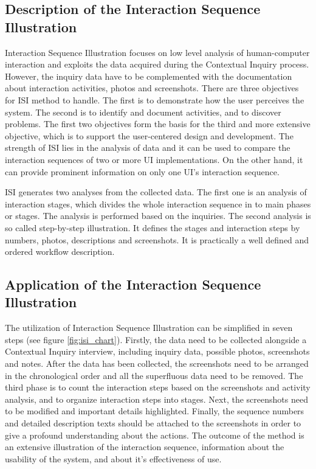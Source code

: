 \documentclass[12pt,a4paper,oneside,pdftex]{report}
\begin{document}
\subsection{Description of the Interaction Sequence Illustration}
Interaction Sequence Illustration focuses on low level analysis of human-computer interaction and exploits the data acquired during the Contextual Inquiry process. However, the inquiry data have to be complemented with the documentation about interaction activities, photos and screenshots. There are three objectives for ISI method to handle. The first is to demonstrate how the user perceives the system. The second is to identify and document activities, and to discover problems. The first two objectives form the basis for the third and more extensive objective, which is to support the user-centered design and development. \citep{RefWorks:17}  The strength of ISI lies in the analysis of data and it can be used to compare the interaction sequences of two or more UI implementations. On the other hand, it can provide prominent information on only one UI's interaction sequence. 

ISI generates two analyses from the collected data. The first one is an analysis of interaction stages, which divides the whole interaction sequence in to main phases or stages. The analysis is performed based on the inquiries. The second analysis is so called step-by-step illustration. It defines the stages and interaction steps by numbers, photos, descriptions and screenshots. \citep{RefWorks:17} It is practically a well defined and ordered workflow description. 

\subsection{Application of the Interaction Sequence Illustration}
The utilization of Interaction Sequence Illustration can be simplified in seven steps (see figure \ref{fig:isi_chart}). Firstly, the data need to be collected alongside a Contextual Inquiry interview, including inquiry data, possible photos, screenshots and notes.
After the data has been collected, the screenshots need to be arranged in the chronological order and all the superfluous data need to be removed. The third phase is to count the interaction steps based on the screenshots and activity analysis, and to organize interaction steps into stages.
Next, the screenshots need to be modified and important details highlighted. Finally, the sequence numbers and  detailed description texts should be attached to the screenshots in order to give a profound understanding about the actions. The outcome of the method is an extensive illustration of the interaction sequence, information about the usability of the system, and about it's effectiveness of use. \citep{RefWorks:17}
	
\end{document}
